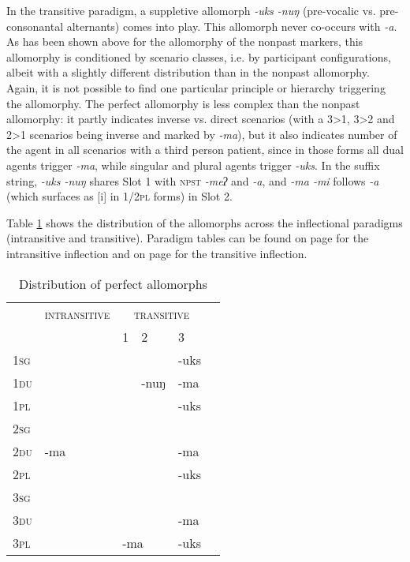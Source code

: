 In the transitive paradigm, a suppletive allomorph \emph{-uks \ti -nuŋ} (pre-vocalic vs. pre-consonantal alternants) comes into play. This allomorph never co-occurs with \emph{-a}. As has been shown above for the allomorphy of the nonpast markers, this allomorphy is conditioned by scenario classes, i.e. by participant configurations, albeit with a slightly different distribution than in the nonpast allomorphy. Again, it is  not possible to find one particular  principle or hierarchy triggering the allomorphy. The perfect allomorphy is less complex than the nonpast allomorphy: it partly indicates inverse vs. direct scenarios (with a 3>1, 3>2 and 2>1 scenarios being inverse and marked by \emph{-ma}), but it also indicates number of the agent in all scenarios with a third person patient, since in those forms all dual agents trigger \emph{-ma}, while singular and plural agents trigger \emph{-uks}. In the suffix string, \emph{-uks \ti -nuŋ} shares Slot 1 with {\scshape npst} \emph{-meʔ} and   \emph{-a}, and \emph{-ma \ti -mi} follows  \emph{-a} (which surfaces as [i] in {\scshape  1/2pl} forms)  in Slot 2.

Table \ref{par-prf-allo} shows the distribution of the allomorphs across the inflectional paradigms (intransitive and transitive). Paradigm tables can be found on page \pageref{par-apma-pst} for the intransitive inflection and on page \pageref{par-chimd-prf} for the transitive inflection. 

\begin{table}
\begin{centering} 
\begin{tabular}{|l||p{1.7cm}|p{1.5cm}|p{1.5cm}|p{1.5cm}|p{1.5cm}|}
\hline
		& {\scshape intransitive}&	\multicolumn{3}{c|}{ {\scshape transitive}}  \\
		\cline{3-5}
		&&	 {\scshape 1}&  {\scshape 2} & {\scshape  3} \\
\hline
\hline
 {\scshape 1sg} 		&& \cellcolor[gray]{.8}&&-uks \\
 \cline{1-1} \cline{5-5} 		
 {\scshape 1du}		& & \cellcolor[gray]{.8}&-nuŋ&-ma\\
 \cline{1-1} \cline{5-5} 			
 {\scshape 1pl}	&& \cellcolor[gray]{.8}&&-uks \\
 \cline{1-1}  \cline{3-4} 		
 {\scshape 2sg	}	& &&\cellcolor[gray]{.8} &   \\
 \cline{1-1} \cline{5-5}			
 {\scshape 2du}	&-ma &&\cellcolor[gray]{.8}  &-ma\\
 \cline{1-1} \cline{5-5}			
 {\scshape 2pl}	& &&\cellcolor[gray]{.8}   &-uks \\
\cline{1-1}  \cline{4-4} 
 {\scshape 3sg}		&&\multicolumn{2}{c|}{}  & \\
  \cline{1-1}  \cline{5-5}					
 {\scshape 3du}&&\multicolumn{2}{c|}{}  &-ma\\
 \cline{1-1} \cline{5-5}
 {\scshape 3pl}& &\multicolumn{2}{l|}{-ma}  &-uks \\
\hline
\end{tabular}
\caption{Distribution of perfect allomorphs}\label{par-prf-allo}
\end{centering}
\end{table}

